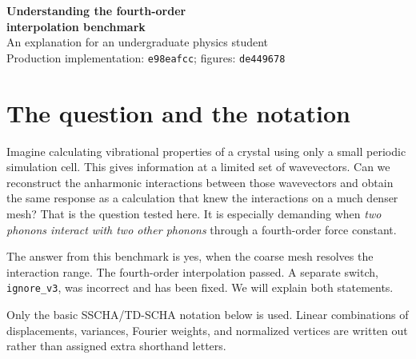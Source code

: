 \documentclass[11pt,a4paper]{article}
\begin{document}
\begin{center}
{\Large\bfseries Understanding the fourth-order\\interpolation benchmark}\\[6pt]
{An explanation for an undergraduate physics student}\\[3pt]
{\small Production implementation: \texttt{e98eafcc}; figures: \texttt{de449678}}
\end{center}

\section{The question and the notation}
Imagine calculating vibrational properties of a crystal using only a small
periodic simulation cell. This gives information at a limited set of wavevectors.
Can we reconstruct the anharmonic interactions between those wavevectors and
obtain the same response as a calculation that knew the interactions on a much
denser mesh? That is the question tested here. It is especially demanding when
\emph{two phonons interact with two other phonons} through a fourth-order force constant.

The answer from this benchmark is yes, when the coarse mesh resolves the
interaction range. The fourth-order interpolation passed. A separate switch,
\texttt{ignore\_v3}, was incorrect and has been fixed. We will explain both statements.

Only the basic SSCHA/TD-SCHA notation below is used. Linear combinations of
displacements, variances, Fourier weights, and normalized vertices are written
out rather than assigned extra shorthand letters.
\end{document}

